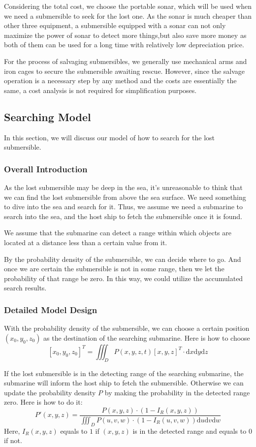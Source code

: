 \documentclass[12pt]{article}
\begin{document}
Considering the total cost, we choose the portable sonar, which will be used when we need a submersible to seek for the lost one. As the sonar is much cheaper than other three equipment, a submersible equipped with a sonar can not only maximize the power of sonar to detect more things,but also save more money as both of them can be used for a long time with relatively low depreciation price. 

For the process of salvaging submersibles, we generally use mechanical arms and iron cages to secure the submersible awaiting rescue. However, since the salvage operation is a necessary step by any method and the costs are essentially the same, a cost analysis is not required for simplification purposes. 

\subsection{Searching Model}
In this section, we will discuss our model of how to search for the lost submersible.

\subsubsection{Overall Introduction}
As the lost submersible may be deep in the sea, it's unreasonable to think that we can find the lost submersible from above the sea surface. We need something to dive into the sea and search for it. Thus, we assume we need a submarine to search into the sea, and the host ship to fetch the submersible once it is found.

We assume that the submarine can detect a range within which objects are located at a distance less than a certain value from it.

By the probability density of the submersible, we can decide where to go. And once we are certain the submersible is not in some range, then we let the probability of that range be zero. In this way, we could utilize the accumulated search results.
\subsubsection{Detailed Model Design}
With the probability density of the submersible, we can choose a certain position $(x_{0},y_{0},z_{0})$ as the destination of the searching submarine. Here is how to choose
$$[x_{0},y_{0},z_{0}]^{T}=\iiint_{D}P(x,y,z,t)[x,y,z]^{T}\cdot\mathrm{d}x\mathrm{d}y\mathrm{d}z$$

If the lost submersible is in the detecting range of the searching submarine, the submarine will inform the host ship to fetch the submersible. Otherwise we can update the probability density $P$ by making the probability in the detected range zero. Here is how to do it:
$$P'(x,y,z) = \frac{P(x,y,z)\cdot(1-I_{R}(x,y,z))}{\iiint_{D} P(u,v,w)\cdot (1-I_{R}(u,v,w))\mathrm{d}u\mathrm{d}v\mathrm{d}w}$$
Here, $I_{R}(x,y,z)$ equals to $1$ if $(x,y,z)$ is in the detected range and equals to $0$ if not.
\end{document}
